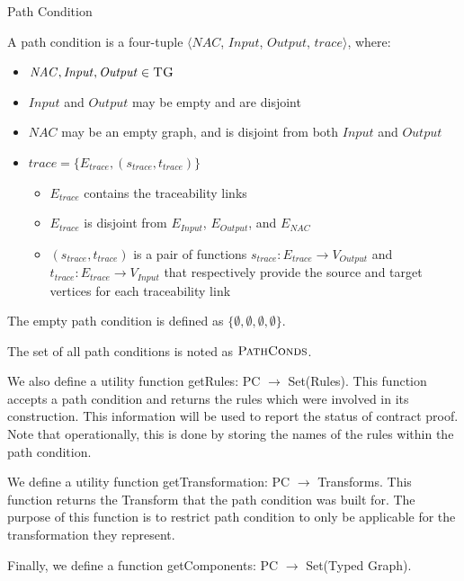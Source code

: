 


\begin{definition}{Path Condition\\}
\label{def:path_condition}

A path condition is a four-tuple $\big\langle \mathit{NAC}$, $\mathit{Input}$, $\mathit{Output}$, $\mathit{trace}\big\rangle$, where:

\begin{itemize}
\item $\mathit{NAC}, \mathit{Input}, \mathit{Output} \in \textsc{TG}$
\item $\mathit{Input}$ and $\mathit{Output} $ may be empty and are disjoint
\item $\mathit{NAC}$ may be an empty graph, and is disjoint from both $\mathit{Input}$ and $\mathit{Output} $
\item $\mathit{trace} = \{E_{trace}, (s_{trace}, t_{trace})\}$
\begin{itemize}
\item $E_{trace}$ contains the traceability links
\item $E_{trace} $ is disjoint from $E_{Input}$, $E_{Output}$, and $E_{NAC}$
\item $(s_{trace}, t_{trace})$ is a pair of functions $s_{trace}: E_{trace}\rightarrow V_{\textit{Output}}$ and $t_{trace}: E_{trace}\rightarrow V_{\textit{Input}}$ that respectively provide the source and target vertices for each traceability link
\end{itemize}

\end{itemize}  

The empty path condition is defined as $\{\emptyset, \emptyset, \emptyset, \emptyset \}$.

The set of all path conditions is noted as $\textsc{PathConds}$.

We also define a utility function getRules: PC $\rightarrow$ Set(Rules). This function accepts a path condition and returns the rules which were involved in its construction. This information will be used to report the status of contract proof. Note that operationally, this is done by storing the names of the rules within the path condition. 

We define a utility function getTransformation: PC $\rightarrow$ Transforms. This function returns the Transform that the path condition was built for. The purpose of this function is to restrict path condition to only be applicable for the transformation they represent.

Finally, we define a function getComponents: PC $\rightarrow$ Set(Typed Graph).

\end{definition}



